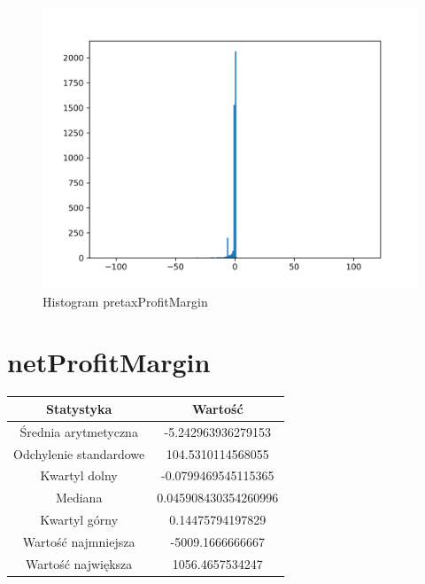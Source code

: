 \documentclass{article}
\begin{document}
\begin{figure}[h!]
    \includegraphics[width=\linewidth]{variables/pretaxProfitMargin.png}
    \caption{Histogram pretaxProfitMargin }
\end{figure}\section{ netProfitMargin }

\begin{center}
    \begin{tabular}{|c | c|} 
    \hline
    Statystyka & Wartość \\
    \hline\hline
    Średnia arytmetyczna & -5.242963936279153 \\ 
    \hline
    Odchylenie standardowe & 104.5310114568055 \\
    \hline
    Kwartyl dolny & -0.0799469545115365 \\
    \hline
    Mediana & 0.045908430354260996 \\
    \hline
    Kwartyl górny & 0.14475794197829 \\
    \hline
    Wartość najmniejsza & -5009.1666666667 \\
    \hline
    Wartość największa & 1056.4657534247 \\
    \hline
   \end{tabular}
\end{center}
\end{document}
